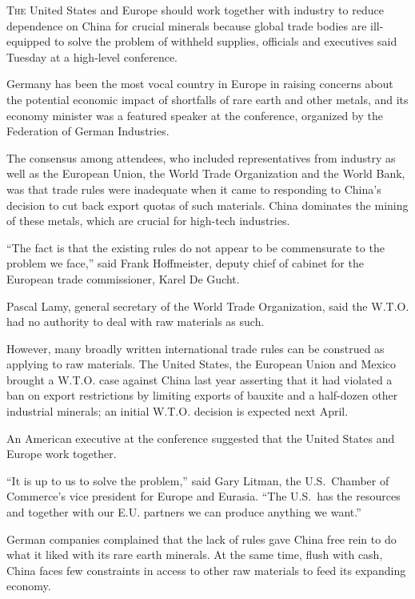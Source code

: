 ﻿\documentclass[12pt]{article}
\begin{document}
\lettrine{T}{he} United States and Europe should work together with industry
to reduce dependence on China for crucial minerals because global trade bodies are ill-equipped to
solve the problem of withheld supplies, officials and executives said Tuesday at a high-level
conference.

Germany has been the most vocal country in Europe in raising concerns about the potential economic
impact of shortfalls of rare earth and other metals, and its economy minister was a featured speaker
at the conference, organized by the Federation of German Industries.

The consensus among attendees, who included representatives from industry as well as the European
Union, the World Trade Organization and the World Bank, was that trade rules were inadequate when it
came to responding to China's decision to cut back export quotas of such materials. China dominates
the mining of these metals, which are crucial for high-tech industries.

``The fact is that the existing rules do not appear to be commensurate to the problem we face,''
said Frank Hoffmeister, deputy chief of cabinet for the European trade commissioner, Karel De Gucht.

Pascal Lamy, general secretary of the World Trade Organization, said the W.T.O. had no authority to
deal with raw materials as such.

However, many broadly written international trade rules can be construed as applying to raw
materials. The United States, the European Union and Mexico brought a W.T.O. case against China last
year asserting that it had violated a ban on export restrictions by limiting exports of bauxite and
a half-dozen other industrial minerals; an initial W.T.O. decision is expected next April.

An American executive at the conference suggested that the United States and Europe work together.

``It is up to us to solve the problem,'' said Gary Litman, the U.S.~Chamber of Commerce's vice
president for Europe and Eurasia. ``The U.S.~has the resources and together with our E.U. partners
we can produce anything we want.''

German companies complained that the lack of rules gave China free rein to do what it liked with its
rare earth minerals. At the same time, flush with cash, China faces few constraints in access to
other raw materials to feed its expanding economy.
\end{document}
